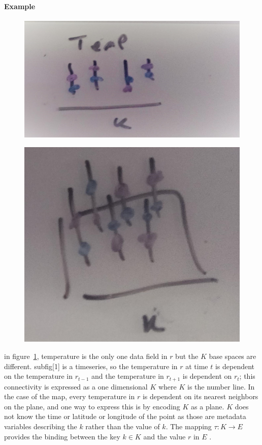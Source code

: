 \documentclass[../main.tex]{subfiles}
\begin{document}
\paragraph{Example}
\begin{figure}[ht]
    \includegraphics[width=\textwidth]{figures/sections/math/temp_1k.png}
    \label{fig:k_data}
\end{figure}

\begin{figure}[H]
    \includegraphics[width=\textwidth]{figures/sections/math/temp_2k.png}
\end{figure}

in figure~\ref{fig:k_data}, temperature is the only one data field in $r$ but the $K$ base spaces are different. subfig[1] is a timeseries, so the temperature in $r$ at time $t$ is dependent on the temperature in $r_{t-1}$ and the temperature in $r_{t+1}$ is dependent on  $r_t$; this connectivity is expressed as a one dimensional $K$ where $K$ is the number line. In the case of the map, every temperature in $r$ is dependent on its nearest neighbors on the plane, and one way to express this is by encoding $K$ as a plane. $K$ does not know the time or latitude or longitude of the point as those are metadata variables describing the $k$ rather than the value of $k$. The mapping $\tau: K \rightarrow E$ provides the binding between the key $k \in K$ and the value $r$ in $E$ \cite{munznerChDataAbstraction}.
\end{document}
